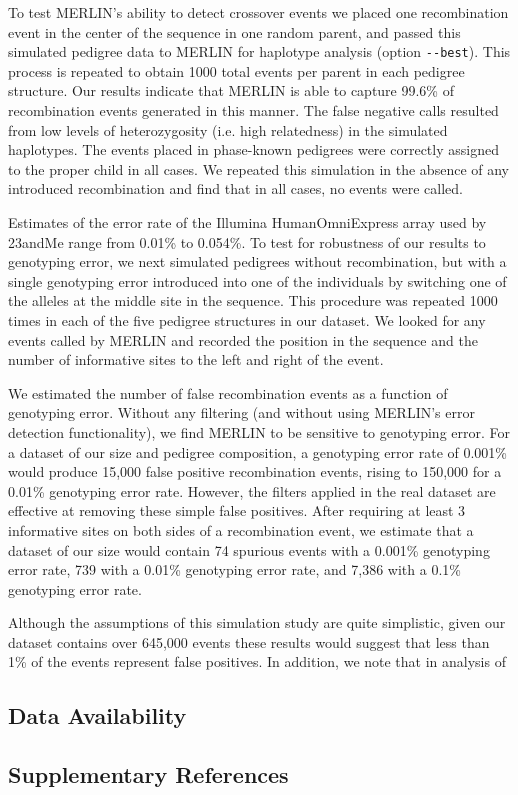 To test MERLIN's ability to detect crossover events we placed one  
recombination event in the center of the sequence in one random parent, and  
passed this simulated pedigree data to MERLIN for haplotype analysis (option
\verb|--best|).  This process is repeated to obtain 1000 total events per parent in each  
pedigree structure. Our results indicate that MERLIN is able to capture 99.6\% of  
recombination events generated in this manner. The false negative calls resulted  
from low levels of heterozygosity (i.e. high relatedness) in the simulated haplotypes.  
The events placed in phase-known pedigrees were correctly assigned to the proper  
child in all cases. We repeated this simulation in the absence of any introduced  
recombination and find that in all cases, no events were called.  

Estimates of the error rate of the Illumina HumanOmniExpress array used by  
23andMe range from 0.01\%\cite{Illumina2013}  to 0.054\%\cite{Imai2011}.  To test for robustness of our results to  
genotyping error, we next simulated pedigrees without recombination, but with a  
single genotyping error introduced into one of the individuals by switching one of  
the alleles at the middle site in the sequence.  This procedure was repeated 1000  
times in each of the five pedigree structures in our dataset.  We looked for any  
events called by MERLIN and recorded the position in the sequence and the number  
of informative sites to the left and right of the event.    

We estimated the number of false recombination events as a function of  
genotyping error.  Without any filtering (and without using MERLIN’s error  
detection functionality), we find MERLIN to be sensitive to genotyping error. For a  
dataset of our size and pedigree composition, a genotyping error rate of 0.001\%  
would produce 15,000 false positive recombination events, rising to 150,000 for a  
0.01\% genotyping error rate. However, the filters applied in the real dataset are  
effective at removing these simple false positives. After requiring at least 3  
informative sites on both sides of a recombination event, we estimate that a dataset  
of our size would contain 74 spurious events with a 0.001\% genotyping error rate,  
739 with a 0.01\% genotyping error rate, and 7,386 with a 0.1\% genotyping error  
rate.   

Although the assumptions of this simulation study are quite simplistic, given  
our dataset contains over 645,000 events these results would suggest that less than  
1\% of the events represent false positives. In addition, we note that in analysis of  

\subsection{Data Availability}

\subsection{Supplementary References}

%
%





